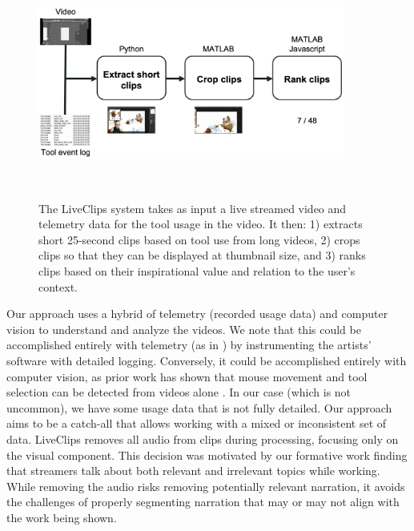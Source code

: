 \begin{figure}[b!]
\centering
  \includegraphics[width=0.9\textwidth]{liveclips/figures/liveclips_system.png}
  \caption[The LiveClips system takes as input a live streamed video and telemetry data for the tool usage in the video. It then: 1) extracts short clips based on tool use, 2) crops clips so that they can be displayed at thumbnail size, and 3) ranks clips for presentation.]{The LiveClips system takes as input a live streamed video and telemetry data for the tool usage in the video. It then: 1) extracts short 25-second clips based on tool use from long videos, 2) crops clips so that they can be displayed at thumbnail size, and 3) ranks clips based on their inspirational value and relation to the user's context. }~\label{fig:liveclips_system}
\end{figure}

Our approach uses a hybrid of telemetry (recorded usage data) and computer vision to understand and analyze the videos. We note that this could be accomplished entirely with telemetry (as in \cite{Grossman2010, Lafreniere2014}) by instrumenting the artists' software with detailed logging. Conversely, it could be accomplished entirely with computer vision, as prior work has shown that mouse movement and tool selection can be detected from videos alone \cite{Banovic2012, Pongnumkul2011}. In our case (which is not uncommon), we have some usage data that is not fully detailed. Our approach aims to be a catch-all that allows working with a mixed or inconsistent set of data. LiveClips removes all audio from clips during processing, focusing only on the visual component. This decision was motivated by our formative work finding that streamers talk about both relevant and irrelevant topics while working. While removing the audio risks removing potentially relevant narration, it avoids the challenges of properly segmenting narration that may or may not align with the work being shown.

